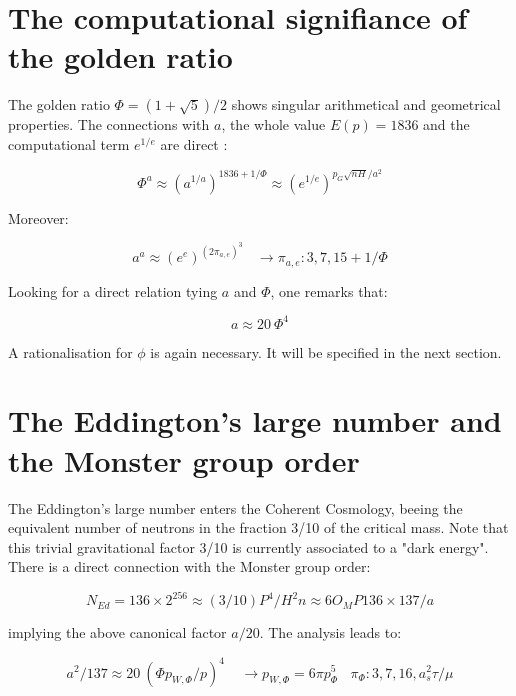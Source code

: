 \documentclass[a4paper,9pt]{article}
\begin{document}
   
   
  \section{The computational signifiance of the golden ratio} 
  
  The golden ratio $\Phi = (1+\sqrt 5)/2$ shows singular arithmetical and geometrical properties. The connections with $a$, the whole value $E(p) = 1836$ and the computational term $e^{1/e}$ are direct :
  
\begin{equation}
\Phi^a \approx (a^{1/a})^{1836 + 1/\Phi} \approx (e^{1/e})^{p_G \sqrt{nH}/a^2}
\end{equation}    
  
Moreover:

\begin{equation}
a^a \approx (e^e)^{(2\pi_{a,e})^3}     ~~~~ \rightarrow   \pi_{a,e} : 3, 7, 15 + 1/\Phi
\end{equation}  
   
Looking for a direct relation tying $a$ and $\Phi$, one remarks that: 

\begin{equation}
a \approx 20 ~ \Phi^4
\end{equation}  
   
A rationalisation for $\phi$ is again necessary. It will be specified in the next section.





   
\section{The Eddington's large number and the Monster group order}

The Eddington's large number enters the Coherent Cosmology, beeing the equivalent number of neutrons in the fraction 3/10 of the critical mass. Note that this trivial gravitational factor 3/10 is currently associated to a "dark energy". There is a direct connection with the Monster group order:

\begin{equation}
N_{Ed} = 136 \times 2^{256} \approx (3/10) P^4/H^2 n \approx 6 O_M P 136\times 137/a
\end{equation} 

implying the above canonical factor $a/20$. The analysis leads to:
 
 \begin{equation}
a^2/137 \approx 20 ~ (\Phi p_{W,\Phi}/p)^4   ~~~~~ \rightarrow  p_{W,\Phi} = 6\pi p_{\Phi}^5  ~~~~ \pi_{\Phi} : 3,7,16,a_s^2\tau/\mu  
\end{equation}  
 
\end{document}
